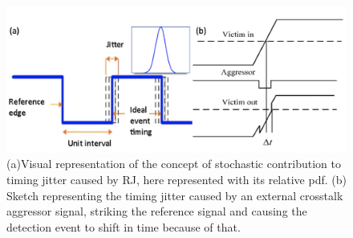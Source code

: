 \begin{figure}[hbtp]
\centering
\includegraphics[width=1\textwidth]{RandomCrosstalk}
\caption{(a)Visual representation of the concept of stochastic contribution to timing jitter caused by RJ, here represented with its relative pdf. \cite{jitterwaveform2017}
(b) Sketch representing the timing jitter caused by an external crosstalk aggressor signal, striking the reference signal and causing the detection event to shift in time because of that. \cite{Crosstalk_Liao}}
\label{RandomIMG}
\end{figure}


